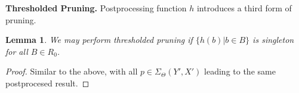 \documentclass{article}
\newtheorem{lemma}{Lemma}
\newtheorem{definition} {Definition}
\newcommand{\GNP}[1][\psi]{{#1}_{\Theta}}
\newcommand{\otimestilde}{\mathbin{\widetilde{\otimes}}}
\newcommand{\odottilde}{\mathbin{\widetilde{\odot}}}
\begin{document}
{\bf Thresholded Pruning.}  Postprocessing function $h$ introduces a
third form of pruning.
\begin{lemma}
  We may perform {\em thresholded pruning} if $\{h(b) | b \in B\}$ is
  singleton for all $B \in R_0$.
\end{lemma}
\begin{proof}
  Similar to the above, with all $p \in \GNP[\Sigma](Y',X')$ leading
  to the same postprocesed result.
\end{proof}


% 
% 
\end{document}
